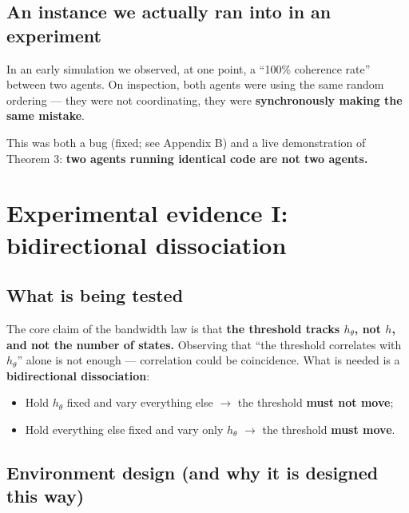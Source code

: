 \documentclass[11pt]{article}
\providecommand{\tightlist}{%
  \setlength{\itemsep}{0pt}\setlength{\parskip}{0pt}}
\begin{document}
\hypertarget{an-instance-we-actually-ran-into-in-an-experiment}{%
\subsection{An instance we actually ran into in an experiment}\label{an-instance-we-actually-ran-into-in-an-experiment}}

In an early simulation we observed, at one point, a ``100\% coherence rate'' between two agents. On inspection, both agents were using the same random ordering --- they were not coordinating, they were \textbf{synchronously making the same mistake}.

This was both a bug (fixed; see Appendix B) and a live demonstration of Theorem 3: \textbf{two agents running identical code are not two agents.}

\hypertarget{experimental-evidence-i-bidirectional-dissociation}{%
\section{Experimental evidence I: bidirectional dissociation}\label{experimental-evidence-i-bidirectional-dissociation}}

\hypertarget{what-is-being-tested}{%
\subsection{What is being tested}\label{what-is-being-tested}}

The core claim of the bandwidth law is that \textbf{the threshold tracks \(h_\theta\), not \(h\), and not the number of states.} Observing that ``the threshold correlates with \(h_\theta\)'' alone is not enough --- correlation could be coincidence. What is needed is a \textbf{bidirectional dissociation}:

\begin{itemize}
\tightlist
\item
  Hold \(h_\theta\) fixed and vary everything else \(\rightarrow\) the threshold \textbf{must not move};
\item
  Hold everything else fixed and vary only \(h_\theta\) \(\rightarrow\) the threshold \textbf{must move}.
\end{itemize}

\hypertarget{environment-design-and-why-it-is-designed-this-way}{%
\subsection{Environment design (and why it is designed this way)}\label{environment-design-and-why-it-is-designed-this-way}}
\end{document}
